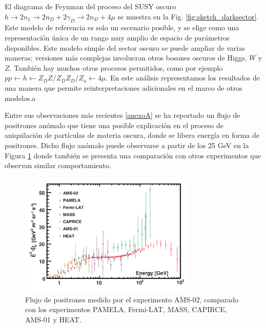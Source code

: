El diagrama de Feynman del proceso del SUSY oscuro  $h \rightarrow 2n_1 \rightarrow 2n_D + 2\gamma_D \rightarrow 2n_D + 4\mu$ se muestra en la Fig. \ref{fig:sketch_darksector}. Este modelo de referencia es solo un escenario posible, y se elige como una representación única de un rango muy amplio de espacio de parámetros disponibles. Este modelo simple del sector oscuro se puede ampliar de varias maneras; versiones más complejas involucran otros bosones oscuros de Higgs, $W$ y $Z$. También hay muchos otros procesos permitidos, como por ejemplo $pp \leftarrow h \leftarrow Z_D Z / Z_D Z_D / Z_a \leftarrow 4\mu$. En este análisis representamos los resultados de una manera que permite reinterpretaciones adicionales en el marco de otros modelos.a





Entre sus observaciones más recientes \ref{anexoA} se ha reportado un flujo de positrones anómalo que tiene una posible explicación en el proceso de aniquilación de partículas de materia oscura, donde se libera energía en forma de positrones. Dicho flujo anómalo puede observarse
a partir de los 25 GeV en la Figura \ref{fig:AMS_positronflux} donde también se presenta una comparación con otros experimentos que observan similar comportamiento.

\begin{figure}[ht!]
    \centering
    \includegraphics[width=0.75\textwidth]{Fisica_de_Particulas/imagenes/AMS_positronflux.png}
    \caption{Flujo de positrones medido por el experimento AMS-02, comparado con los experimentos PAMELA, Fermi-LAT, MASS, CAPIRCE, AMS-01 y HEAT.}
    \label{fig:AMS_positronflux}
\end{figure}

